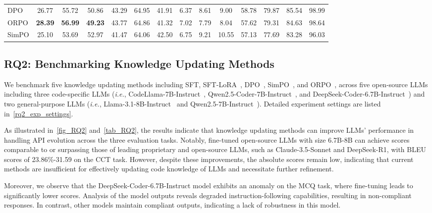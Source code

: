 \begin{table*}[!t]
\begin{minipage}[t]{\linewidth}
\begin{tabular}{l|ccc|ccc|ccc|cccc}
        DPO & 26.77 & 55.72 & 50.86 & 43.29 & 64.95 & 41.91 & 6.37 & 8.61 & 9.00 & 58.78 & 79.87 & 85.54 & 98.99\\
        ORPO & \cellcolor{lightblue}\textbf{28.39} & \cellcolor{lightblue}\textbf{56.99} & \cellcolor{lightblue}\textbf{49.23} & 43.77 & 64.86 & 41.32 & 7.02 & 7.79 & 8.04 & 57.62 & 79.31 & 84.63 & 98.64\\
        SimPO & 25.10 & 53.69 & 52.97 & 41.47 & 64.06 & 42.50 & 6.75 & 9.21 & 10.55 & 57.13 & 77.69 & 83.28 & 96.03\\
        \bottomrule
    \end{tabular}
    \label{tab_RQ2}
\end{minipage}
\end{table*}

\subsection{RQ2: Benchmarking Knowledge Updating Methods}
We benchmark five knowledge updating methods including SFT, SFT-LoRA~\cite{peng2023instruction}, DPO~\cite{rafailov2023dpo}, SimPO~\cite{meng2024simpo}, and ORPO~\cite{hong2024orpo}, across five open-source LLMs including three code-specific LLMs (\emph{i.e.}, CodeLlama-7B-Instruct~\cite{Roziere2023codellama}, Qwen2.5-Coder-7B-Instruct~\cite{hui2024qwen2.5coder}, and DeepSeek-Coder-6.7B-Instruct~\cite{guo2024deepseek}) and two general-purpose LLMs (\emph{i.e.}, Llama-3.1-8B-Instruct~\cite{dubey2024llama3} and Qwen2.5-7B-Instruct~\cite{qwen2.5}). Detailed experiment settings are listed in~\cref{rq2_exp_settings}.

As illustrated in~\autoref{fig_RQ2} and~\autoref{tab_RQ2}, the results indicate that knowledge updating methods can improve LLMs' performance in handling API evolution across the three evaluation tasks. Notably, fine-tuned open-source LLMs with size 6.7B-8B can achieve scores comparable to or surpassing those of leading proprietary and open-source LLMs, such as Claude-3.5-Sonnet and DeepSeek-R1, with BLEU scores of 23.86\%-31.59 on the CCT task. However, despite these improvements, the absolute scores remain low, indicating that current methods are insufficient for effectively updating code knowledge of LLMs and necessitate further refinement.

Moreover, we observe that the DeepSeek-Coder-6.7B-Instruct model exhibits an anomaly on the MCQ task, where fine-tuning leads to significantly lower scores. Analysis of the model outputs reveals degraded instruction-following capabilities, resulting in non-compliant responses. In contrast, other models maintain compliant outputs, indicating a lack of robustness in this model.

